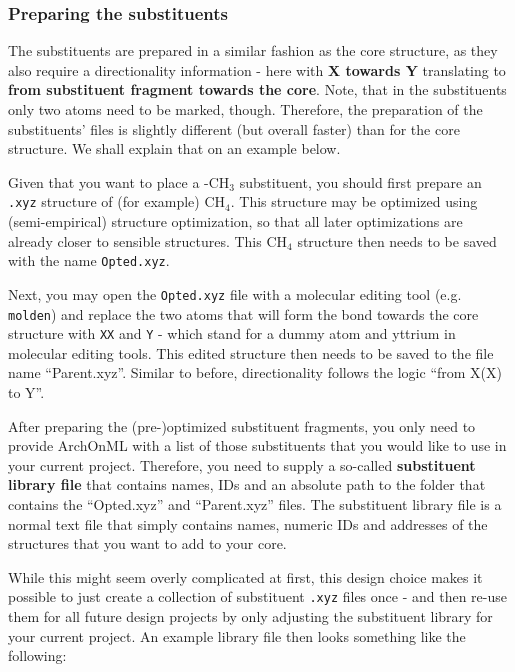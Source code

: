 \documentclass[12pt]{achemso}
\begin{document}
\newpage

\subsubsection{Preparing the substituents}

\noindent The substituents are prepared in a similar fashion as the core structure, as they also require a directionality information - here with \textbf{X towards Y} translating to \textbf{from substituent fragment towards the core}. Note, that in the substituents only two atoms need to be marked, though. Therefore, the preparation of the substituents' files is slightly different (but overall faster) than for the core structure. We shall explain that on an example below.

\noindent Given that you want to place a -CH$_3$ substituent, you should first prepare an \texttt{.xyz} structure of (for example) CH$_4$. This structure may be optimized using (semi-empirical) structure optimization, so that all later optimizations are already closer to sensible structures. This CH$_4$ structure then needs to be saved with the name \verb+Opted.xyz+.

\noindent Next, you may open the \verb+Opted.xyz+ file with a molecular editing tool (e.g. \texttt{molden}) and replace the two atoms that will form the bond towards the core structure with \verb+XX+ and \verb+Y+ - which stand for a dummy atom and yttrium in molecular editing tools. This edited structure then needs to be saved to the file name ``Parent.xyz''. Similar to before, directionality follows the logic ``from X(X) to Y''. 

\noindent After preparing the (pre-)optimized substituent fragments, you only need to provide ArchOnML with a list of those substituents that you would like to use in your current project. Therefore, you need to supply a so-called \textbf{substituent library file} that contains names, IDs and an absolute path to the folder that contains the ``Opted.xyz'' and ``Parent.xyz'' files. The substituent library file is a normal text file that simply contains names, numeric IDs and addresses of the structures that you want to add to your core.

\noindent While this might seem overly complicated at first, this design choice makes it possible to just create a collection of substituent \texttt{.xyz} files once - and then re-use them for all future design projects by only adjusting the substituent library for your current project. An example library file then looks something like the following:\\[-1.2em]
\end{document}
